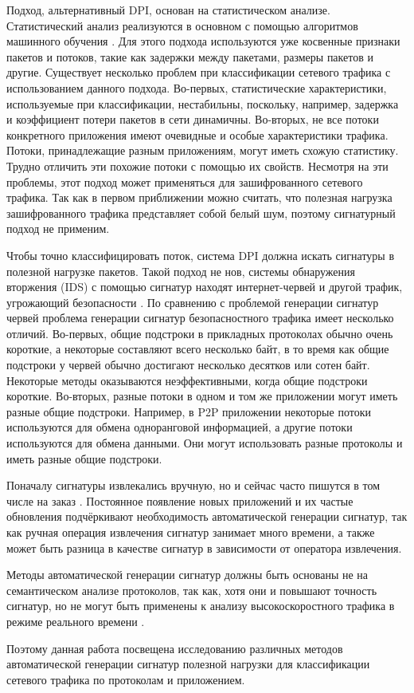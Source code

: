 Подход, альтернативный DPI, основан на статистическом анализе.
Статистический анализ реализуются в основном с помощью алгоритмов машинного обучения \cite{erman2006qrp05}.
Для этого подхода используются уже косвенные признаки пакетов и потоков, такие как задержки между пакетами, размеры пакетов и другие.
Существует несколько проблем при классификации сетевого трафика с использованием данного подхода.
Во-первых, статистические характеристики, используемые при классификации, нестабильны, поскольку, например, задержка и коэффициент потери пакетов в сети динамичны.
Во-вторых, не все потоки конкретного приложения имеют очевидные и особые характеристики трафика.
Потоки, принадлежащие разным приложениям, могут иметь схожую статистику. Трудно отличить эти похожие потоки с помощью их свойств.
Несмотря на эти проблемы, этот подход может применяться для зашифрованного сетевого трафика.
Так как в первом приближении можно считать, что полезная нагрузка зашифрованного трафика представляет собой белый шум,
поэтому сигнатурный подход не применим.

Чтобы точно классифицировать поток, система DPI должна искать сигнатуры в полезной нагрузке пакетов.
Такой подход не нов, системы обнаружения вторжения (IDS) с помощью сигнатур находят интернет-червей и другой трафик, угрожающий безопасности
\cite{singh2004automated, kim2004autograph, newsome2005polygraph}.
По сравнению с проблемой генерации сигнатур червей проблема генерации сигнатур безопасностного трафика имеет несколько отличий.
Во-первых, общие подстроки в прикладных протоколах обычно очень короткие, а некоторые составляют всего несколько байт,
в то время как общие подстроки у червей обычно достигают несколько десятков или сотен байт.
Некоторые методы \cite{singh2004automated, kim2004autograph} оказываются неэффективными, когда общие подстроки короткие.
Во-вторых, разные потоки в одном и том же приложении могут иметь разные общие подстроки.
Например, в P2P приложении некоторые потоки используются для обмена одноранговой информацией,
а другие потоки используются для обмена данными. Они могут использовать разные протоколы и иметь разные общие подстроки.

Поначалу сигнатуры извлекались вручную, но и сейчас часто пишутся в том числе на заказ \cite{amonitoring}.
Постоянное появление новых приложений и их частые обновления подчёркивают необходимость автоматической генерации сигнатур,
так как ручная операция извлечения сигнатур занимает много времени, а также может быть разница в качестве сигнатур в зависимости от оператора извлечения.

Методы автоматической генерации сигнатур должны быть основаны не на семантическом анализе протоколов, так как, хотя они и повышают точность сигнатур,
но не могут быть применены к анализу высокоскоростного трафика в режиме реального времени \cite{park2008towards}.

Поэтому данная работа посвещена исследованию различных методов автоматической генерации сигнатур полезной нагрузки для классификации сетевого трафика по протоколам и приложением.

\newpage
